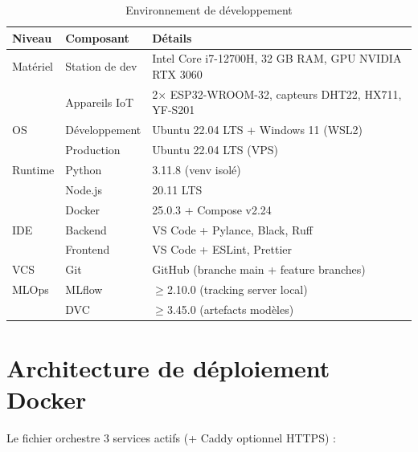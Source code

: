 \begin{table}[H]
\centering
\caption{Environnement de développement}
\label{tab:env_dev}
\begin{tabularx}{\linewidth}{llX}
\toprule
\textbf{Niveau} & \textbf{Composant} & \textbf{Détails} \\
\midrule
Matériel & Station de dev & Intel Core i7-12700H, 32 GB RAM, GPU NVIDIA RTX 3060 \\
         & Appareils IoT  & 2$\times$ ESP32-WROOM-32, capteurs DHT22, HX711, YF-S201 \\
OS       & Développement  & Ubuntu 22.04 LTS + Windows 11 (WSL2) \\
         & Production     & Ubuntu 22.04 LTS (VPS) \\
Runtime  & Python         & 3.11.8 (venv isolé) \\
         & Node.js        & 20.11 LTS \\
         & Docker         & 25.0.3 + Compose v2.24 \\
IDE      & Backend        & VS Code + Pylance, Black, Ruff \\
         & Frontend       & VS Code + ESLint, Prettier \\
VCS      & Git            & GitHub (branche main + feature branches) \\
MLOps    & MLflow         & $\geq$2.10.0 (tracking server local) \\
         & DVC            & $\geq$3.45.0 (artefacts modèles) \\
\bottomrule
\end{tabularx}
\end{table}

\section{Architecture de déploiement Docker}

Le fichier  orchestre 3 services actifs (+ Caddy optionnel HTTPS) :

